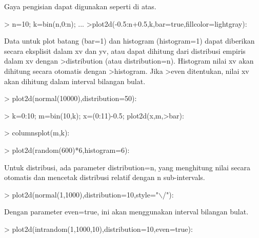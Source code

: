 \documentclass{report}
\begin{document}
\begin{eulernotebook}
\begin{eulercomment}
\begin{eulercomment}
\begin{eulercomment}
\begin{eulercomment}
\begin{eulercomment}
Gaya pengisian dapat digunakan seperti di atas.
\end{eulercomment}
\begin{eulerprompt}
> n=10; k=bin(n,0:n); ...
>plot2d(-0.5:n+0.5,k,bar=true,fillcolor=lightgray):
\end{eulerprompt}
\begin{eulercomment}
Data untuk plot batang (bar=1) dan histogram (histogram=1) dapat
diberikan secara eksplisit dalam xv dan yv, atau dapat dihitung dari
distribusi empiris dalam xv dengan \textgreater{}distribution (atau
distribution=n). Histogram nilai xv akan dihitung secara otomatis
dengan \textgreater{}histogram. Jika \textgreater{}even ditentukan, nilai xv akan dihitung dalam
interval bilangan bulat.
\end{eulercomment}
\begin{eulerprompt}
> plot2d(normal(10000),distribution=50):
\end{eulerprompt}
\begin{eulerprompt}
> k=0:10; m=bin(10,k); x=(0:11)-0.5; plot2d(x,m,>bar):
\end{eulerprompt}
\begin{eulerprompt}
> columnsplot(m,k):
\end{eulerprompt}
\begin{eulerprompt}
> plot2d(random(600)*6,histogram=6):
\end{eulerprompt}
\begin{eulercomment}
Untuk distribusi, ada parameter distribution=n, yang menghitung nilai
secara otomatis dan mencetak distribusi relatif dengan n
sub-intervals.
\end{eulercomment}
\begin{eulerprompt}
> plot2d(normal(1,1000),distribution=10,style="\(\backslash\)/"):
\end{eulerprompt}
\begin{eulercomment}
Dengan parameter even=true, ini akan menggunakan interval bilangan
bulat.
\end{eulercomment}
\begin{eulerprompt}
> plot2d(intrandom(1,1000,10),distribution=10,even=true):

\end{eulerprompt}
\end{eulercomment}
\end{eulercomment}
\end{eulercomment}
\end{eulercomment}
\end{eulernotebook}
\end{document}
